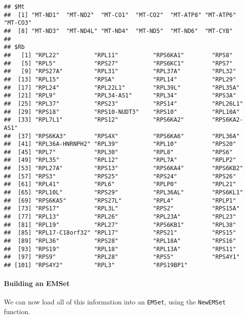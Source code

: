 \documentclass[]{article}
\let\oldparagraph\paragraph
\renewcommand{\paragraph}[1]{\oldparagraph{#1}\mbox{}}
\begin{document}
\begin{verbatim}
## $Mt
##  [1] "MT-ND1"  "MT-ND2"  "MT-CO1"  "MT-CO2"  "MT-ATP8" "MT-ATP6" "MT-CO3" 
##  [8] "MT-ND3"  "MT-ND4L" "MT-ND4"  "MT-ND5"  "MT-ND6"  "MT-CYB" 
## 
## $Rb
##   [1] "RPL22"          "RPL11"          "RPS6KA1"        "RPS8"          
##   [5] "RPL5"           "RPS27"          "RPS6KC1"        "RPS7"          
##   [9] "RPS27A"         "RPL31"          "RPL37A"         "RPL32"         
##  [13] "RPL15"          "RPSA"           "RPL14"          "RPL29"         
##  [17] "RPL24"          "RPL22L1"        "RPL39L"         "RPL35A"        
##  [21] "RPL9"           "RPL34-AS1"      "RPL34"          "RPS3A"         
##  [25] "RPL37"          "RPS23"          "RPS14"          "RPL26L1"       
##  [29] "RPS18"          "RPS10-NUDT3"    "RPS10"          "RPL10A"        
##  [33] "RPL7L1"         "RPS12"          "RPS6KA2"        "RPS6KA2-AS1"   
##  [37] "RPS6KA3"        "RPS4X"          "RPS6KA6"        "RPL36A"        
##  [41] "RPL36A-HNRNPH2" "RPL39"          "RPL10"          "RPS20"         
##  [45] "RPL7"           "RPL30"          "RPL8"           "RPS6"          
##  [49] "RPL35"          "RPL12"          "RPL7A"          "RPLP2"         
##  [53] "RPL27A"         "RPS13"          "RPS6KA4"        "RPS6KB2"       
##  [57] "RPS3"           "RPS25"          "RPS24"          "RPS26"         
##  [61] "RPL41"          "RPL6"           "RPLP0"          "RPL21"         
##  [65] "RPL10L"         "RPS29"          "RPL36AL"        "RPS6KL1"       
##  [69] "RPS6KA5"        "RPS27L"         "RPL4"           "RPLP1"         
##  [73] "RPS17"          "RPL3L"          "RPS2"           "RPS15A"        
##  [77] "RPL13"          "RPL26"          "RPL23A"         "RPL23"         
##  [81] "RPL19"          "RPL27"          "RPS6KB1"        "RPL38"         
##  [85] "RPL17-C18orf32" "RPL17"          "RPS21"          "RPS15"         
##  [89] "RPL36"          "RPS28"          "RPL18A"         "RPS16"         
##  [93] "RPS19"          "RPL18"          "RPL13A"         "RPS11"         
##  [97] "RPS9"           "RPL28"          "RPS5"           "RPS4Y1"        
## [101] "RPS4Y2"         "RPL3"           "RPS19BP1"
\end{verbatim}

\hypertarget{building-an-emset}{%
\paragraph{Building an EMSet}\label{building-an-emset}}

We can now load all of this information into an \texttt{EMSet}, using
the \texttt{NewEMSet} function.
\end{document}
